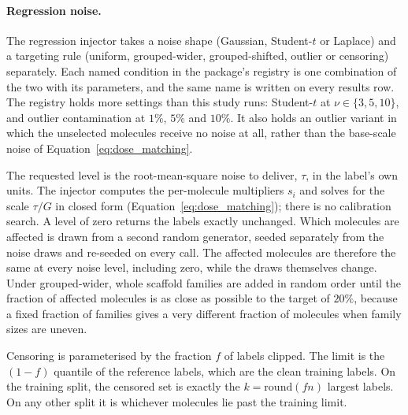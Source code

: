 \paragraph{Regression noise.} The regression injector takes a noise shape (Gaussian, Student-$t$ or
Laplace) and a targeting rule (uniform, grouped-wider, grouped-shifted, outlier or censoring)
separately. Each named condition in the package's registry is one combination of the two with its
parameters, and the same name is written on every results row. The registry holds more settings
than this study runs: Student-$t$ at $\nu \in \{3, 5, 10\}$, and outlier contamination at $1\%$,
$5\%$ and $10\%$. It also holds an outlier variant in which the unselected molecules receive no
noise at all, rather than the base-scale noise of Equation~\ref{eq:dose_matching}.

The requested level is the root-mean-square noise to deliver, $\tau$, in the label's own units. The
injector computes the per-molecule multipliers $s_i$ and solves for the scale $\tau / G$ in closed
form (Equation~\ref{eq:dose_matching}); there is no calibration search. A level of zero returns the
labels exactly unchanged. Which molecules are affected is drawn from a second random generator,
seeded separately from the noise draws and re-seeded on every call. The affected molecules are
therefore the same at every noise level, including zero, while the draws themselves change. Under
grouped-wider, whole scaffold families are added in random order until the fraction of affected
molecules is as close as possible to the target of $20\%$, because a fixed fraction of families
gives a very different fraction of molecules when family sizes are uneven.

Censoring is parameterised by the fraction $f$ of labels clipped. The limit is the $(1-f)$ quantile
of the reference labels, which are the clean training labels. On the training split, the censored
set is exactly the $k = \mathrm{round}(fn)$ largest labels. On any other split it is whichever
molecules lie past the training limit.

